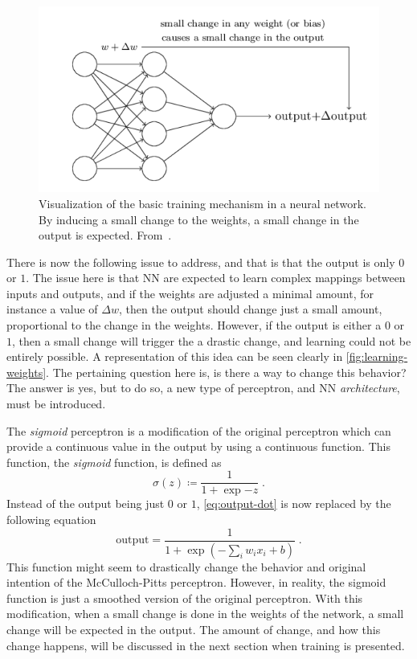 \begin{figure}
    \centering
    \includegraphics[scale=0.4]{figuras/capitulo-3/learning-weights}
    \caption{Visualization of the basic training mechanism in a neural network. By inducing a small change to the weights, a small change in the output is expected. From~\cite{nielsenNeuralNetworksDeep2015}.}
    \label{fig:learning-weights}
\end{figure}

There is now the following issue to address, and that is that the output is only \(0\) or 
\(1\). The issue here is that NN are expected to learn complex mappings between inputs and 
outputs, and if the weights are adjusted a minimal amount, for instance a value of 
\(\Delta w\), then the output should change just a small amount, proportional to the change 
in the weights. However, if the output is either a \(0\) or \(1\), then a small change will 
trigger the a drastic change, and learning could not be entirely possible. A representation 
of this idea can be seen clearly in \autoref{fig:learning-weights}. The pertaining question 
here is, is there a way to change this behavior? The answer is yes, but to do so, a new 
type of perceptron, and NN \emph{architecture}, must be introduced.

The \emph{sigmoid} perceptron is a modification of the original perceptron which can provide a continuous value in the output by using a continuous function. This function, the \emph{sigmoid} function, is defined as
\begin{equation}
    \sigma(z) \coloneqq \frac{1}{1 + \exp{-z}}
    \; .
    \label{eq:sigmoid}
\end{equation}
Instead of the output being just \(0\) or \(1\), \autoref{eq:output-dot} is now replaced by the following equation
\begin{equation}
    \text{output} = \frac{1}{1 + \exp{\left(- \sum_{i} w_i x_i + b\right)}}
    \; .
\end{equation}
This function might seem to drastically change the behavior and original intention of the 
McCulloch-Pitts perceptron. However, in reality, the sigmoid function is just a smoothed 
version of the original perceptron. With this modification, when a small change is done in 
the weights of the network, a small change will be expected in the output. The amount of change, and how this change happens, will be discussed in the next section when training is presented.

